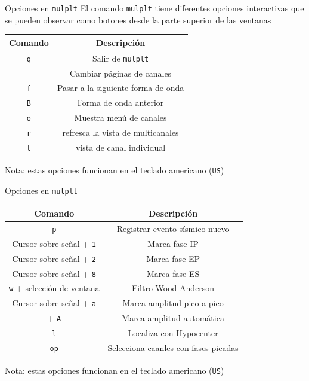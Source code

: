 \documentclass[11pt]{beamer}
\begin{document}
\begin{frame}{Opciones en {\tt mulplt}}
El comando {\tt mulplt} tiene diferentes opciones interactivas que se pueden observar como botones desde la parte superior de las ventanas
\begin{table} 
\begin{tabular}{|c|c|}
\hline 
{\bf Comando} & {\bf Descripción} \\ 
\hline 
{\tt q} & Salir de {\tt mulplt} \\ 
\hline 
\keys{\tab} & Cambiar páginas de canales \\ 
\hline 
{\tt f} & Pasar a la siguiente forma de onda  \\ 
\hline 
{\tt B} & Forma de onda anterior \\ 
\hline 
{\tt o} & Muestra menú de canales\\ 
\hline 
{\tt r} & refresca la vista de multicanales \\ 
\hline
{\tt t} & vista de canal individual \\ 
\hline 
\end{tabular}
\end{table}
{\scriptsize Nota: estas opciones funcionan en el teclado americano ({\tt US})}
\end{frame}

\begin{frame}{Opciones en {\tt mulplt}}
\begin{table}
\begin{tabular}{|c|c|}
\hline
{\bf Comando} & {\bf Descripción}\\ 
\hline
{\tt p} & Registrar evento sísmico nuevo \\ 
\hline 
Cursor sobre señal + {\tt 1} & Marca fase IP  \\ 
\hline 
Cursor sobre señal + {\tt 2} & Marca fase EP \\ 
\hline 
Cursor sobre señal + {\tt 8} & Marca fase ES \\ 
\hline 
{\tt w} + selección de ventana & Filtro Wood-Anderson \\ 
\hline
Cursor sobre señal + {\tt a} & Marca amplitud pico a pico\\
\hline 
\keys{\shift} + {\tt A} & Marca amplitud automática \\ 
\hline 
{\tt l} & Localiza con Hypocenter \\ 
\hline 
{\tt op} & Selecciona caanles con fases picadas \\ 
\hline 
\end{tabular}
\end{table}
{\scriptsize Nota: estas opciones funcionan en el teclado americano ({\tt US})} 
\end{frame}
\end{document}

